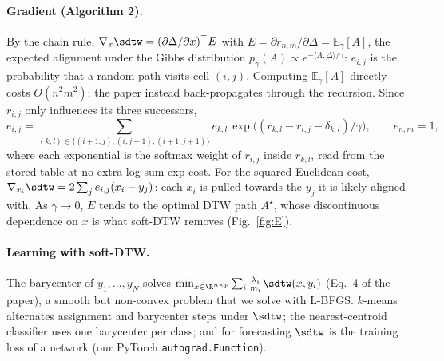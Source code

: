 \paragraph{Gradient (Algorithm 2).}
By the chain rule, $\nabla_x\sdtw=(\partial\Delta/\partial x)^\top E$ with $E=\partial r_{n,m}/\partial\Delta=\mathbb E_\gamma[A]$, the expected alignment under the Gibbs distribution $p_\gamma(A)\propto e^{-\langle A,\Delta\rangle/\gamma}$: $e_{i,j}$ is the probability that a random path visits cell $(i,j)$. Computing $\mathbb E_\gamma[A]$ directly costs $O(n^2m^2)$; the paper instead back-propagates through the recursion. Since $r_{i,j}$ only influences its three successors,
\begin{equation}
e_{i,j}=\sum_{(k,l)\in\{(i+1,j),(i,j+1),(i+1,j+1)\}} e_{k,l}\,\exp\!\big((r_{k,l}-r_{i,j}-\delta_{k,l})/\gamma\big),\qquad e_{n,m}=1,
\end{equation}
where each exponential is the softmax weight of $r_{i,j}$ inside $r_{k,l}$, read from the stored table at no extra log-sum-exp cost. For the squared Euclidean cost, $\nabla_{x_i}\sdtw=2\sum_j e_{i,j}(x_i-y_j)$: each $x_i$ is pulled towards the $y_j$ it is likely aligned with. As $\gamma\to0$, $E$ tends to the optimal DTW path $A^\star$, whose discontinuous dependence on $x$ is what soft-DTW removes (Fig.~\ref{fig:E}).

\paragraph{Learning with soft-DTW.}
The barycenter of $y_1,\dots,y_N$ solves $\min_{x\in\R^{n\times p}}\sum_i \frac{\lambda_i}{m_i}\sdtw(x,y_i)$ (Eq.~4 of the paper), a smooth but non-convex problem that we solve with L-BFGS. $k$-means alternates assignment and barycenter steps under $\sdtw$; the nearest-centroid classifier uses one barycenter per class; and for forecasting $\sdtw$ is the training loss of a network (our PyTorch \texttt{autograd.Function}).

